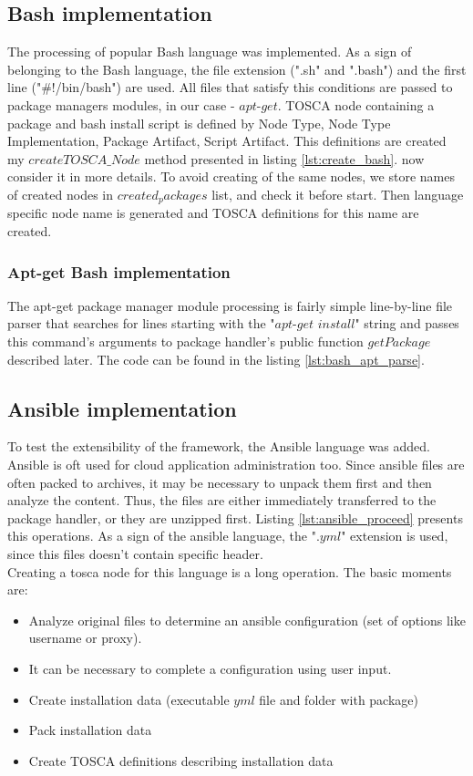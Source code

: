 \subsection*{Bash implementation}
The processing of popular Bash language was implemented.
As a sign of belonging to the Bash language, the file extension (".sh" and ".bash") and the first line ("#!/bin/bash") are used. 
All files that satisfy this conditions are passed to package managers modules, in our case - $apt$-$get$. 
TOSCA node containing a package and bash install script is defined by Node Type, Node Type Implementation, Package Artifact, Script Artifact.
This definitions are created my $createTOSCA\_Node$ method presented in listing \ref{lst:create_bash}.
now consider it in more details.
To avoid creating of the same nodes, we store names of created nodes in $created_packages$ list, and check it before start.
Then language specific node name is generated and TOSCA definitions for this name are created.

\subsubsection*{Apt-get Bash implementation}
The apt-get package manager module processing is fairly simple line-by-line file parser that searches for lines starting with the "$apt$-$get$ $install$" string and passes this command's arguments to package handler's public function $getPackage$ described later. 
The code can be found in the listing \ref{lst:bash_apt_parse}.
\subsection*{Ansible implementation}
To test the extensibility of the framework, the Ansible language was added.
Ansible is oft used for cloud application administration too.
Since ansible files are often packed to archives, it may be necessary to unpack them first and  then analyze the content.
Thus, the files are either immediately transferred to the package handler, or they are unzipped first.
Listing \ref{lst:ansible_proceed} presents this operations.
As a sign of the ansible language, the ".$yml$" extension is used, since this files doesn't contain specific header.\\
Creating a \gls{tosca} node for this language is a long operation. 
The basic moments are:
\begin{itemize}
	\item Analyze original files to determine an ansible configuration (set of options like username or proxy).
	\item It can be necessary to complete a configuration using user input.
	\item Create installation data (executable $yml$ file and folder with package)
	\item Pack installation data
	\item Create TOSCA definitions describing installation data
\end{itemize} 

